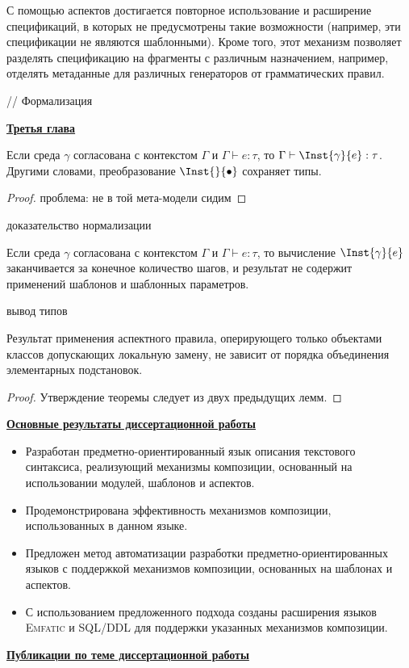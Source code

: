 \documentclass[12pt,a4paper]{article}
\newcommand{\tool}[1]{\textsc{#1}}
\newcommand{\afsubsection}[1]{\par \textbf{\underline{#1}}}
\begin{document}
С помощью аспектов достигается повторное использование  и расширение спецификаций, в которых не предусмотрены такие возможности (например, эти спецификации не являются шаблонными). Кроме того, этот механизм позволяет разделять спецификацию на фрагменты с различным назначением, например, отделять метаданные для различных генераторов от грамматических правил.

// Формализация

\afsubsection{Третья глава} 

\begin{Th}
Если среда $\gamma$ согласована с контекстом $\Gamma$ и $\Gamma \vdash e : \tau$, то $\Gamma \vdash \Inst{\gamma}{e} : \tau$. Другими словами, преобразование $\Inst{}{\bullet}$ сохраняет типы.
\end{Th}
\begin{proof}
проблема: не в той мета-модели сидим
\end{proof}

доказательство нормализации

\begin{Th}
Если среда $\gamma$ согласована с контекстом $\Gamma$ и $\Gamma \vdash e : \tau$, то вычисление $\Inst{\gamma}{e}$ заканчивается за конечное количество шагов, и результат не содержит применений шаблонов и шаблонных параметров.
\end{Th}

вывод типов

\begin{Th}
Результат применения аспектного правила, оперирующего только объектами классов допускающих локальную замену, не зависит от порядка объединения элементарных подстановок.
\end{Th}
\begin{proof}
Утверждение теоремы следует из двух предыдущих лемм.
\end{proof}


\afsubsection{Основные результаты диссертационной работы}
\begin{itemize}
\item Разработан предметно-ориентированный язык описания текстового синтаксиса, реализующий механизмы композиции, основанный на использовании модулей, шаблонов и аспектов.
\item Продемонстрирована эффективность механизмов композиции, использованных в данном языке.
\item Предложен метод автоматизации разработки предметно-ориентированных языков с поддержкой механизмов композиции, основанных на шаблонах и аспектов.
\item С использованием предложенного подхода созданы расширения языков \tool{Emfatic} и \tool{SQL/DDL} для поддержки указанных механизмов композиции.
\end{itemize}

\par
\begin{center}
\afsubsection{Публикации по теме диссертационной работы}
\end{center}
\end{document}
